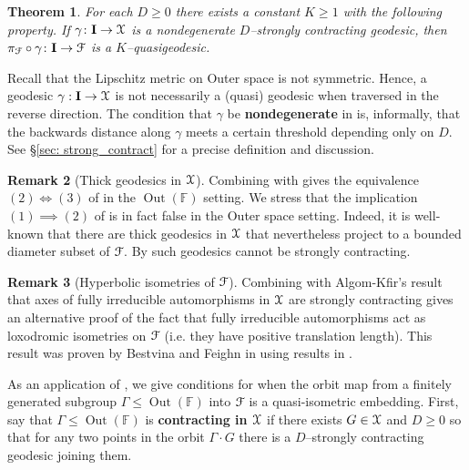 \documentclass[letterpaper,fleqn]{article}
\theoremstyle{plain}
\newtheorem{theorem}{Theorem}[section]
\theoremstyle{definition}
\newtheorem{remark}[theorem]{Remark}
\newcommand{\define}[1]{\textbf{#1}}
\DeclareMathOperator{\Out}{Out}
\newcommand{\free}{\mathbb{F}} %
\newcommand{\factor}{{\EuScript F}} %
\newcommand{\F}{\factor} %
\newcommand{\fc}{\factor} %
\newcommand{\os}{{\EuScript X}} %
\newcommand{\X}{\os}
\newcommand{\fproj}{\pi_\fc} %
\newcommand{\I}{\mathbf{I}}
\begin{document}
\begin{theorem}\label{thm:contraction_impies_progress}
For each $D\ge 0$ there exists a constant $K\ge 1$ with the following property. If $\gamma\colon \I\to \os$ is a nondegenerate $D$--strongly contracting geodesic, then $\fproj\circ\gamma\colon \I\to \fc$ is a $K$--quasigeodesic.
\end{theorem}

Recall that the Lipschitz metric on Outer space is not symmetric. Hence, a geodesic $\gamma: \I \to\X$ is not necessarily a (quasi) geodesic when traversed in the reverse direction. The condition that $\gamma$ be \define{nondegenerate} in  is, informally, that the backwards distance along $\gamma$ meets a certain threshold depending only on $D$. See \S\ref{sec: strong_contract} for a precise definition and discussion.

\begin{remark}[Thick geodesics in $\X$]
Combining  with  gives the equivalence $(2)\iff(3)$ of  in the $\Out(\free)$ setting. We stress that the implication $(1)\implies (2)$ of  is in fact false in the Outer space setting. 
Indeed, it is well-known that there are thick geodesics in $\os$ that nevertheless project to a bounded diameter subset of $\fc$. By  such geodesics cannot be strongly contracting.
\end{remark}


\begin{remark}[Hyperbolic isometries of $\F$]
Combining  with Algom-Kfir's result \cite{AKaxis} that axes of fully irreducible automorphisms in $\X$ are strongly contracting gives an alternative proof of the fact that fully irreducible automorphisms act as loxodromic isometries on $\F$ (i.e. they have positive translation length). This result was proven by Bestvina and Feighn in \cite{BFhyp} using results in \cite{bestvina2010hyperbolic}.
\end{remark}


As an application of , we give conditions for when the orbit map from a finitely generated subgroup $\Gamma\le\Out(\free)$ into $\F$ is a quasi-isometric embedding. First, say that $\Gamma \le \Out(\free)$ is \define{contracting in $\X$} if there exists $G \in \X$ and $D\ge0$ so that for any two points in the orbit $\Gamma \cdot G$ there is a $D$--strongly contracting geodesic joining them.
\end{document}
